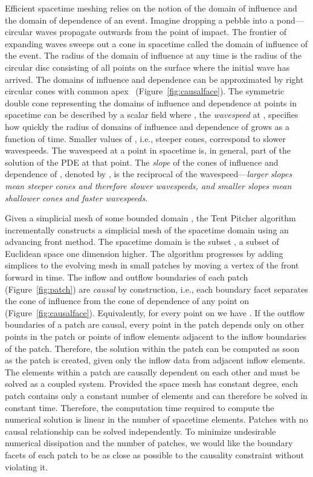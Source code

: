 \documentclass[twocolumn]{article}
\begin{document}
Efficient spacetime meshing relies on the notion of the domain of
influence and the domain of dependence of an event.  Imagine dropping
a pebble into a pond---circular waves propagate outwards from the
point of impact.  The frontier of expanding waves sweeps out a cone in
spacetime called the domain of influence of the event.  The radius of
the domain of influence at any time is the radius of the circular disc
consisting of all points on the surface where the initial wave has
arrived.  The domains of influence and dependence can be approximated
by right circular cones with common apex~
(Figure~\ref{fig:causalface}).  The symmetric double cone representing
the domains of influence and dependence at points  in spacetime
can be described by a scalar field  where , the \emph{wavespeed} at , specifies how
quickly the radius  of domains of influence and dependence of 
grows as a function of time.  Smaller values of , i.e.,
steeper cones, correspond to slower wavespeeds.  The wavespeed
 at a point in spacetime is, in general, part of the
solution of the PDE at that point.  The \emph{slope} of the cones of
influence and dependence of , denoted by , is the
reciprocal of the wavespeed---\emph{larger slopes mean steeper cones
  and therefore slower wavespeeds, and smaller slopes mean shallower
  cones and faster wavespeeds}.

Given a simplicial mesh of some bounded domain ,
the Tent Pitcher algorithm incrementally constructs a simplicial mesh
of the spacetime domain using an advancing front method.  The
spacetime domain is the subset , a subset of Euclidean space one dimension higher.  The
algorithm progresses by adding simplices to the evolving mesh in small
patches by moving a vertex of the front forward in time.  The inflow
and outflow boundaries of each patch (Figure~\ref{fig:patch}) are
\emph{causal} by construction, i.e., each boundary facet  separates
the cone of influence from the cone of dependence of any point on 
(Figure~\ref{fig:causalface}).  Equivalently, for every point  on
 we have .  If the
outflow boundaries of a patch are causal, every point in the patch
depends only on other points in the patch or points of inflow elements
adjacent to the inflow boundaries of the patch.  Therefore, the
solution within the patch can be computed as soon as the patch is
created, given only the inflow data from adjacent inflow elements.
The elements within a patch are causally dependent on each other and
must be solved as a coupled system.  Provided the space mesh has
constant degree, each patch contains only a constant number of
elements and can therefore be solved in constant time.  Therefore, the
computation time required to compute the numerical solution is
linear in the number of spacetime elements.  Patches with no causal
relationship can be solved independently.  To minimize undesirable
numerical dissipation and the number of patches, we would like the
boundary facets of each patch to be as close as possible to the
causality constraint without violating it.
\end{document}
